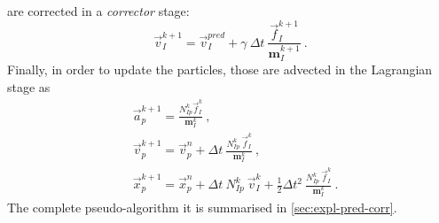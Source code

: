 \message{ !name(2020_EFM_MPM_Eigensoftening.tex)}\documentclass[preprint,12pt,a4paper]{elsarticle}
\newcommand{\tens}[1]{
  \ensuremath{\mathbf{{#1}}}
}
\begin{document}
are corrected in a \textit{corrector} stage:
\begin{equation}
  \label{eq:Corrector-velocity}
  \vec{v}_{I}^{k+1} = \vec{v}_{I}^{pred} + \gamma\ \Delta t\
  \frac{\vec{f}_{I}^{k+1}}{\tens{m}_I^{k+1}}\ .
\end{equation}
Finally, in order to update the particles, those are advected in the Lagrangian stage as
\begin{align}
  \label{eq:Update-lagrangian-pce}
        &\vec{a}_p^{k+1} =
          \frac{N_{Ip}^k\vec{f}_{I}^{k}}{\tens{m}_I^k}\ ,\\
      &\vec{v}_p^{k+1} = \vec{v}_p^n + \Delta t\
        \frac{N_{Ip}^k\
        \vec{f}_{I}^{k}}{\tens{m}_I^k}\ ,\\
      &\vec{x}_p^{k+1} = \vec{x}_p^n + \Delta t\
         N_{Ip}^k\ \vec{v}_{I}^{k} +
        \frac{1}{2}\Delta t^2\ \frac{N_{Ip}^k\
        \vec{f}_{I}^{k}}{\tens{m}_I^k}\ .
\end{align}
The complete pseudo-algorithm it is summarised in \ref{sec:expl-pred-corr}.
\end{document}
